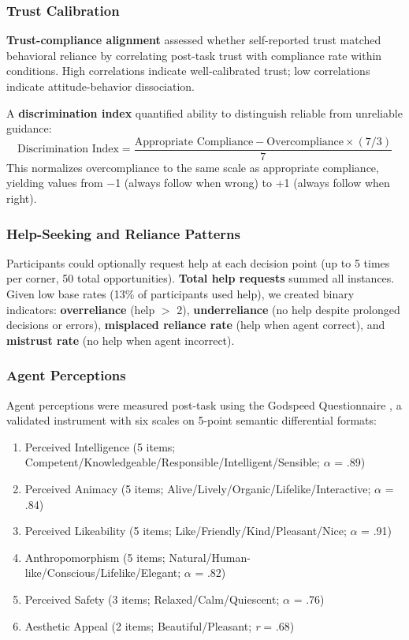\documentclass[12pt]{article}
\begin{document}
\subsubsection{Trust Calibration}

\textbf{Trust-compliance alignment} assessed whether self-reported trust matched behavioral reliance by correlating post-task trust with compliance rate within conditions. High correlations indicate well-calibrated trust; low correlations indicate attitude-behavior dissociation.

A \textbf{discrimination index} quantified ability to distinguish reliable from unreliable guidance:
\begin{equation}
\text{Discrimination Index} = \frac{\text{Appropriate Compliance} - \text{Overcompliance} \times (7/3)}{7}
\end{equation}
This normalizes overcompliance to the same scale as appropriate compliance, yielding values from $-$1 (always follow when wrong) to +1 (always follow when right).

\subsubsection{Help-Seeking and Reliance Patterns}

Participants could optionally request help at each decision point (up to 5 times per corner, 50 total opportunities). \textbf{Total help requests} summed all instances. Given low base rates (13\% of participants used help), we created binary indicators: \textbf{overreliance} (help $>$ 2), \textbf{underreliance} (no help despite prolonged decisions or errors), \textbf{misplaced reliance rate} (help when agent correct), and \textbf{mistrust rate} (no help when agent incorrect).

\subsubsection{Agent Perceptions}

Agent perceptions were measured post-task using the Godspeed Questionnaire \citep{bartneck2009measurement}, a validated instrument with six scales on 5-point semantic differential formats:

\begin{enumerate}
\item Perceived Intelligence (5 items; Competent/Knowledgeable/Responsible/Intelligent/Sensible; $\alpha$ = .89)
\item Perceived Animacy (5 items; Alive/Lively/Organic/Lifelike/Interactive; $\alpha$ = .84)
\item Perceived Likeability (5 items; Like/Friendly/Kind/Pleasant/Nice; $\alpha$ = .91)
\item Anthropomorphism (5 items; Natural/Human-like/Conscious/Lifelike/Elegant; $\alpha$ = .82)
\item Perceived Safety (3 items; Relaxed/Calm/Quiescent; $\alpha$ = .76)
\item Aesthetic Appeal (2 items; Beautiful/Pleasant; \textit{r} = .68)
\end{enumerate}
\end{document}
